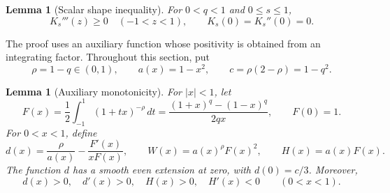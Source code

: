 \documentclass[11pt,a4paper]{amsart}
\numberwithin{equation}{section}
\newtheorem{lemma}[theorem]{Lemma}
\theoremstyle{remark}
\begin{document}
\begin{lemma}[Scalar shape inequality]\label{lem:scalar}
For $0<q<1$ and $0\le s\le1$,
\begin{equation}
 K_s'''(z)\ge0\quad(-1<z<1),\qquad K_s(0)=K_s''(0)=0.
 \label{eq:Kshape}
\end{equation}
\end{lemma}

The proof uses an auxiliary function whose positivity is obtained
from an integrating factor. Throughout this section, put
\[
 \rho=1-q\in(0,1),\qquad a(x)=1-x^2,\qquad
 c=\rho(2-\rho)=1-q^2.
\]

\begin{lemma}[Auxiliary monotonicity]\label{lem:auxiliary}
For $|x|<1$, let
\begin{equation}
 F(x)=\frac12\int_{-1}^{1}(1+tx)^{-\rho}\,dt
 =\frac{(1+x)^q-(1-x)^q}{2qx},\qquad F(0)=1.
 \label{eq:realF}
\end{equation}
For $0<x<1$, define
\[
 d(x)=\frac{\rho}{a(x)}-\frac{F'(x)}{xF(x)},\qquad
 W(x)=a(x)^\rho F(x)^2,\qquad H(x)=a(x)F(x).
\]
The function $d$ has a smooth even extension at zero, with
$d(0)=c/3$. Moreover,
\[
 d(x)>0,\quad d'(x)>0,\quad H(x)>0,\quad H'(x)<0
 \qquad(0<x<1).
\]
\end{lemma}
\end{document}

